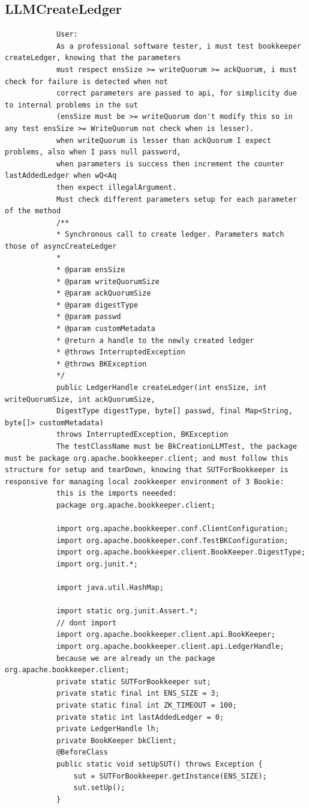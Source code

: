 \documentclass[10pt]{article}
\begin{document}
{		\subsection{LLMCreateLedger}
		\label{sec:LLMCreateLedger}
		\begin{verbatim}
			User:
			As a professional software tester, i must test bookkeeper createLedger, knowing that the parameters 
			must respect ensSize >= writeQuorum >= ackQuorum, i must check for failure is detected when not 
			correct parameters are passed to api, for simplicity due to internal problems in the sut 
			(ensSize must be >= writeQuorum don't modify this so in any test ensSize >= WriteQuorum not check when is lesser). 
			when writeQuorum is lesser than ackQuorum I expect problems, also when I pass null password,
			when parameters is success then increment the counter lastAddedLedger when wQ<Aq 
			then expect illegalArgument. 
			Must check different parameters setup for each parameter of the method
			/**
			* Synchronous call to create ledger. Parameters match those of asyncCreateLedger
			*
			* @param ensSize
			* @param writeQuorumSize
			* @param ackQuorumSize
			* @param digestType
			* @param passwd
			* @param customMetadata
			* @return a handle to the newly created ledger
			* @throws InterruptedException
			* @throws BKException
			*/
			public LedgerHandle createLedger(int ensSize, int writeQuorumSize, int ackQuorumSize,
			DigestType digestType, byte[] passwd, final Map<String, byte[]> customMetadata)
			throws InterruptedException, BKException 
			The testClassName must be BkCreationLLMTest, the package must be package org.apache.bookkeeper.client; and must follow this structure for setup and tearDown, knowing that SUTForBookkeeper is responsive for managing local zookkeeper environment of 3 Bookie:
			this is the imports neeeded:
			package org.apache.bookkeeper.client;
			
			import org.apache.bookkeeper.conf.ClientConfiguration;
			import org.apache.bookkeeper.conf.TestBKConfiguration;
			import org.apache.bookkeeper.client.BookKeeper.DigestType;
			import org.junit.*;
			
			import java.util.HashMap;
			
			import static org.junit.Assert.*;
			// dont import 
			import org.apache.bookkeeper.client.api.BookKeeper;
			import org.apache.bookkeeper.client.api.LedgerHandle;
			because we are already un the package org.apache.bookkeeper.client;
			private static SUTForBookkeeper sut; 
			private static final int ENS_SIZE = 3;
			private static final int ZK_TIMEOUT = 100;
			private static int lastAddedLedger = 0;
			private LedgerHandle lh;
			private BookKeeper bkClient; 
			@BeforeClass
			public static void setUpSUT() throws Exception {
				sut = SUTForBookkeeper.getInstance(ENS_SIZE);
				sut.setUp();
			}
			

\end{verbatim}}
\end{document}
